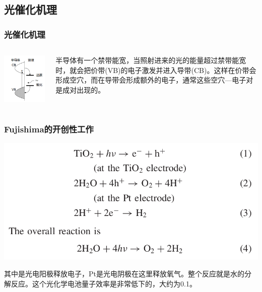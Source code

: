 \documentclass[xetex,compress]{mybeamer}
\begin{document}
\subsection{光催化机理}
\begin{frame}
\frametitle{光催化机理}
\begin{columns}
\begin{block}{}
\centering
\includegraphics[scale=0.6]{figures/光催化机理图} 
\end{block}
\begin{block}{}
半导体有一个禁带能宽，当照射进来的光的能量超过禁带能宽时，就会把价带(VB)的电子激发并进入导带(CB)。这样在价带会形成空穴，而在导带会形成额外的电子，通常这些空穴—电子对是成对出现的。
\end{block}
\end{columns}
\end{frame}


\begin{frame}
\frametitle{Fujishima的开创性工作}
\begin{block}{}
\centering
\includegraphics[scale=0.3]{figures/光分解水化学反应式} 
\end{block}
\begin{block}{}
其中是光电阳极释放电子，Pt是光电阴极在这里释放氧气。整个反应就是水的分解反应。这个光化学电池量子效率是非常低下的，大约为0.1。
\end{block}
\end{frame}
\end{document}
